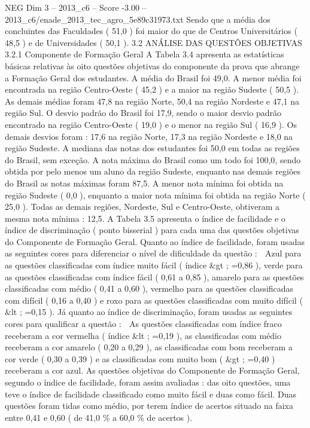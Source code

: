 \begin{textsample}{NEG Dim 3 – 2013\_c6 – Score -3.00 – 2013\_c6/enade\_2013\_tec\_agro\_5e89c31973.txt}
Sendo que a média dos concluintes das Faculdades ( 51,0 ) foi maior do que de Centros Universitários ( 48,5 ) e de Universidades ( 50,1 ). 3.2 ANÁLISE DAS QUESTÕES OBJETIVAS 3.2.1 Componente de Formação Geral A Tabela 3.4 apresenta as estatísticas básicas relativas às oito questões objetivas do componente da prova que abrange a Formação Geral dos estudantes.
A média do Brasil foi 49,0.
A menor média foi encontrada na região Centro-Oeste ( 45,2 ) e a maior na região Sudeste ( 50,5 ).
As demais médias foram 47,8 na região Norte, 50,4 na região Nordeste e 47,1 na região Sul.
O desvio padrão do Brasil foi 17,9, sendo o maior desvio padrão encontrado na região Centro-Oeste ( 19,0 ) e o menor na região Sul ( 16,9 ).
Os demais desvios foram : 17,6 na região Norte, 17,3 na região Nordeste e 18,0 na região Sudeste.
A mediana das notas dos estudantes foi 50,0 em todas as regiões do Brasil, sem exceção.
A nota máxima do Brasil como um todo foi 100,0, sendo obtida por pelo menos um aluno da região Sudeste, enquanto nas demais regiões do Brasil as notas máximas foram 87,5.
A menor nota mínima foi obtida na região Sudeste ( 0,0 ), enquanto a maior nota mínima foi obtida na região Norte ( 25,0 ).
Todas as demais regiões, Nordeste, Sul e Centro-Oeste, obtiveram a mesma nota mínima : 12,5.
A Tabela 3.5 apresenta o índice de facilidade e o índice de discriminação ( ponto bisserial ) para cada uma das questões objetivas do Componente de Formação Geral.
Quanto ao índice de facilidade, foram usadas as seguintes cores para diferenciar o nível de dificuldade da questão :  Azul para as questões classificadas com índice muito fácil ( índice \&gt ; =0,86 ), verde para as questões classificadas com índice fácil ( 0,61 a 0,85 ), amarelo para as questões classificadas com médio ( 0,41 a 0,60 ), vermelho para as questões classificadas com difícil ( 0,16 a 0,40 ) e roxo para as questões classificadas com muito difícil ( \&lt ; =0,15 ).
Já quanto ao índice de discriminação, foram usadas as seguintes cores para qualificar a questão :  As questões classificadas com índice fraco receberam a cor vermelha ( índice \&lt ; =0,19 ), as classificadas com médio receberam a cor amarelo ( 0,20 a 0,29 ), as classificadas com bom receberam a cor verde ( 0,30 a 0,39 ) e as classificadas com muito bom ( \&gt ; =0,40 ) receberam a cor azul.
As questões objetivas do Componente de Formação Geral, segundo o índice de facilidade, foram assim avaliadas : das oito questões, uma teve o índice de facilidade classificado como muito fácil e duas como fácil.
Duas questões foram tidas como médio, por terem índice de acertos situado na faixa entre 0,41 e 0,60 ( de 41,0 \% a 60,0 \% de acertos ).

\end{textsample}
